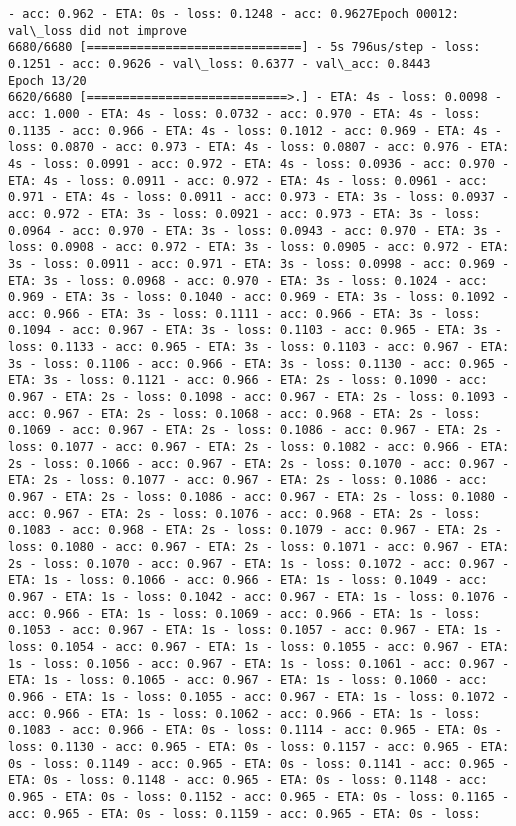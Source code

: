 \documentclass[11pt]{article}
\begin{document}
\begin{Verbatim}[commandchars=\\\{\}]
- acc: 0.962 - ETA: 0s - loss: 0.1248 - acc: 0.9627Epoch 00012: val\_loss did not improve
6680/6680 [==============================] - 5s 796us/step - loss: 0.1251 - acc: 0.9626 - val\_loss: 0.6377 - val\_acc: 0.8443
Epoch 13/20
6620/6680 [============================>.] - ETA: 4s - loss: 0.0098 - acc: 1.000 - ETA: 4s - loss: 0.0732 - acc: 0.970 - ETA: 4s - loss: 0.1135 - acc: 0.966 - ETA: 4s - loss: 0.1012 - acc: 0.969 - ETA: 4s - loss: 0.0870 - acc: 0.973 - ETA: 4s - loss: 0.0807 - acc: 0.976 - ETA: 4s - loss: 0.0991 - acc: 0.972 - ETA: 4s - loss: 0.0936 - acc: 0.970 - ETA: 4s - loss: 0.0911 - acc: 0.972 - ETA: 4s - loss: 0.0961 - acc: 0.971 - ETA: 4s - loss: 0.0911 - acc: 0.973 - ETA: 3s - loss: 0.0937 - acc: 0.972 - ETA: 3s - loss: 0.0921 - acc: 0.973 - ETA: 3s - loss: 0.0964 - acc: 0.970 - ETA: 3s - loss: 0.0943 - acc: 0.970 - ETA: 3s - loss: 0.0908 - acc: 0.972 - ETA: 3s - loss: 0.0905 - acc: 0.972 - ETA: 3s - loss: 0.0911 - acc: 0.971 - ETA: 3s - loss: 0.0998 - acc: 0.969 - ETA: 3s - loss: 0.0968 - acc: 0.970 - ETA: 3s - loss: 0.1024 - acc: 0.969 - ETA: 3s - loss: 0.1040 - acc: 0.969 - ETA: 3s - loss: 0.1092 - acc: 0.966 - ETA: 3s - loss: 0.1111 - acc: 0.966 - ETA: 3s - loss: 0.1094 - acc: 0.967 - ETA: 3s - loss: 0.1103 - acc: 0.965 - ETA: 3s - loss: 0.1133 - acc: 0.965 - ETA: 3s - loss: 0.1103 - acc: 0.967 - ETA: 3s - loss: 0.1106 - acc: 0.966 - ETA: 3s - loss: 0.1130 - acc: 0.965 - ETA: 3s - loss: 0.1121 - acc: 0.966 - ETA: 2s - loss: 0.1090 - acc: 0.967 - ETA: 2s - loss: 0.1098 - acc: 0.967 - ETA: 2s - loss: 0.1093 - acc: 0.967 - ETA: 2s - loss: 0.1068 - acc: 0.968 - ETA: 2s - loss: 0.1069 - acc: 0.967 - ETA: 2s - loss: 0.1086 - acc: 0.967 - ETA: 2s - loss: 0.1077 - acc: 0.967 - ETA: 2s - loss: 0.1082 - acc: 0.966 - ETA: 2s - loss: 0.1066 - acc: 0.967 - ETA: 2s - loss: 0.1070 - acc: 0.967 - ETA: 2s - loss: 0.1077 - acc: 0.967 - ETA: 2s - loss: 0.1086 - acc: 0.967 - ETA: 2s - loss: 0.1086 - acc: 0.967 - ETA: 2s - loss: 0.1080 - acc: 0.967 - ETA: 2s - loss: 0.1076 - acc: 0.968 - ETA: 2s - loss: 0.1083 - acc: 0.968 - ETA: 2s - loss: 0.1079 - acc: 0.967 - ETA: 2s - loss: 0.1080 - acc: 0.967 - ETA: 2s - loss: 0.1071 - acc: 0.967 - ETA: 2s - loss: 0.1070 - acc: 0.967 - ETA: 1s - loss: 0.1072 - acc: 0.967 - ETA: 1s - loss: 0.1066 - acc: 0.966 - ETA: 1s - loss: 0.1049 - acc: 0.967 - ETA: 1s - loss: 0.1042 - acc: 0.967 - ETA: 1s - loss: 0.1076 - acc: 0.966 - ETA: 1s - loss: 0.1069 - acc: 0.966 - ETA: 1s - loss: 0.1053 - acc: 0.967 - ETA: 1s - loss: 0.1057 - acc: 0.967 - ETA: 1s - loss: 0.1054 - acc: 0.967 - ETA: 1s - loss: 0.1055 - acc: 0.967 - ETA: 1s - loss: 0.1056 - acc: 0.967 - ETA: 1s - loss: 0.1061 - acc: 0.967 - ETA: 1s - loss: 0.1065 - acc: 0.967 - ETA: 1s - loss: 0.1060 - acc: 0.966 - ETA: 1s - loss: 0.1055 - acc: 0.967 - ETA: 1s - loss: 0.1072 - acc: 0.966 - ETA: 1s - loss: 0.1062 - acc: 0.966 - ETA: 1s - loss: 0.1083 - acc: 0.966 - ETA: 0s - loss: 0.1114 - acc: 0.965 - ETA: 0s - loss: 0.1130 - acc: 0.965 - ETA: 0s - loss: 0.1157 - acc: 0.965 - ETA: 0s - loss: 0.1149 - acc: 0.965 - ETA: 0s - loss: 0.1141 - acc: 0.965 - ETA: 0s - loss: 0.1148 - acc: 0.965 - ETA: 0s - loss: 0.1148 - acc: 0.965 - ETA: 0s - loss: 0.1152 - acc: 0.965 - ETA: 0s - loss: 0.1165 - acc: 0.965 - ETA: 0s - loss: 0.1159 - acc: 0.965 - ETA: 0s - loss: 
\end{Verbatim}
\end{document}
